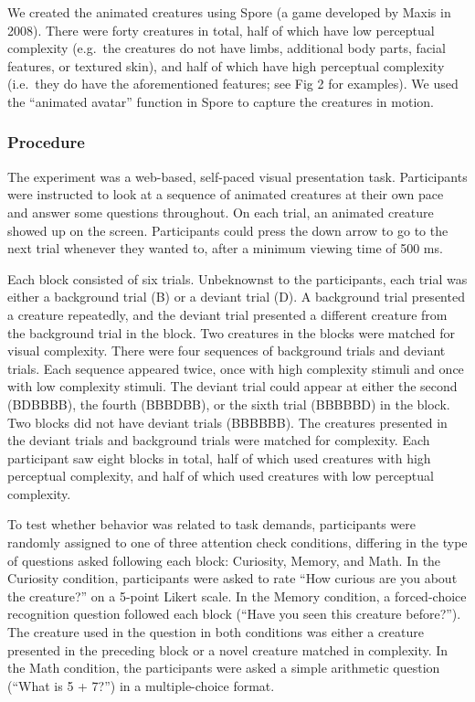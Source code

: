 \documentclass[10pt, letterpaper]{article}
\begin{document}
We created the animated creatures using Spore (a game developed by Maxis
in 2008). There were forty creatures in total, half of which have low
perceptual complexity (e.g.~the creatures do not have limbs, additional
body parts, facial features, or textured skin), and half of which have
high perceptual complexity (i.e.~they do have the aforementioned
features; see Fig 2 for examples). We used the ``animated avatar''
function in Spore to capture the creatures in motion.

\hypertarget{procedure}{%
\subsubsection{Procedure}\label{procedure}}

The experiment was a web-based, self-paced visual presentation task.
Participants were instructed to look at a sequence of animated creatures
at their own pace and answer some questions throughout. On each trial,
an animated creature showed up on the screen. Participants could press
the down arrow to go to the next trial whenever they wanted to, after a
minimum viewing time of 500 ms.

Each block consisted of six trials. Unbeknownst to the participants,
each trial was either a background trial (B) or a deviant trial (D). A
background trial presented a creature repeatedly, and the deviant trial
presented a different creature from the background trial in the block.
Two creatures in the blocks were matched for visual complexity. There
were four sequences of background trials and deviant trials. Each
sequence appeared twice, once with high complexity stimuli and once with
low complexity stimuli. The deviant trial could appear at either the
second (BDBBBB), the fourth (BBBDBB), or the sixth trial (BBBBBD) in the
block. Two blocks did not have deviant trials (BBBBBB). The creatures
presented in the deviant trials and background trials were matched for
complexity. Each participant saw eight blocks in total, half of which
used creatures with high perceptual complexity, and half of which used
creatures with low perceptual complexity.

To test whether behavior was related to task demands, participants were
randomly assigned to one of three attention check conditions, differing
in the type of questions asked following each block: Curiosity, Memory,
and Math. In the Curiosity condition, participants were asked to rate
``How curious are you about the creature?'' on a 5-point Likert scale.
In the Memory condition, a forced-choice recognition question followed
each block (``Have you seen this creature before?''). The creature used
in the question in both conditions was either a creature presented in
the preceding block or a novel creature matched in complexity. In the
Math condition, the participants were asked a simple arithmetic question
(``What is 5 + 7?'') in a multiple-choice format.
\end{document}
